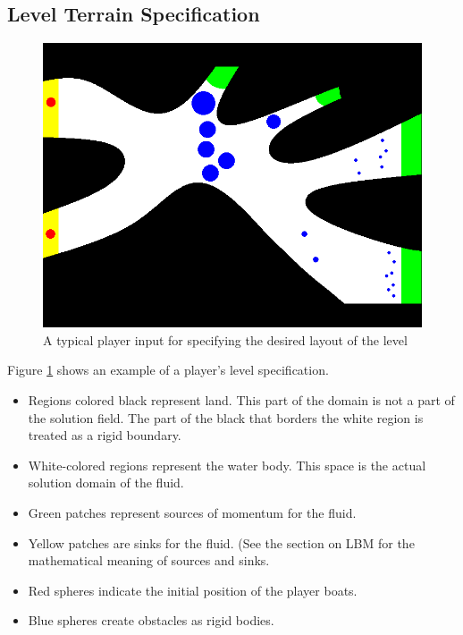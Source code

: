 \subsection{Level Terrain Specification}

\begin{figure}
\centering
  \includegraphics[scale=0.4]{img/ImageProcessing/Level6.png}
\caption{A typical player input for specifying the desired layout of the level\label{fig:LevelInput}}
\end{figure}

Figure \ref{fig:LevelInput} shows an example of a player's level specification.
\begin{itemize}
	\item Regions colored black represent land. This part of the domain is not a part of the solution field. The part of the black that borders the white region is treated as a rigid boundary.
	\item White-colored regions represent the water body. This space is the actual solution domain of the fluid.
	\item Green patches represent sources of momentum for the fluid.
	\item Yellow patches are sinks for the fluid. (See the section on LBM for the mathematical meaning of sources and sinks.
	\item Red spheres indicate the initial position of the player boats.
	\item Blue spheres create obstacles as rigid bodies.
\end{itemize}
